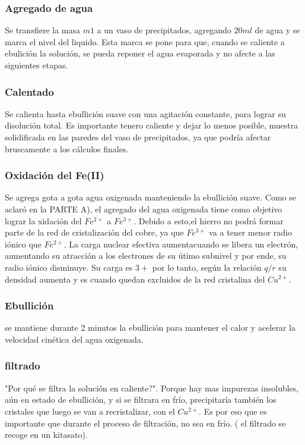 \documentclass[a4paper,12pt]{article}
\begin{document}
  \subsubsection{Agregado de agua} Se transfiere la masa  $m1$ a un vaso de precipitados, agregando $20ml$ de agua y se marca el nivel del liquido. Esta marca se pone para que, cuando se caliente a ebulición la solución, se pueda reponer el agua evaporada y no afecte a las siguientes etapas.
  
  \subsubsection{Calentado} Se calienta hasta ebullición suave con una agitación constante, para lograr su disolución total. Es importante tenero caliente y dejar lo menos posible, muestra solidificada en las paredes del vaso de precipitados, ya que podría afectar bruscamente a los cálculos finales.
  
  \subsubsection{Oxidación del Fe(II)}Se agrega gota a gota agua oxigenada manteniendo la ebullición suave. Como se aclaró en la PARTE A), el agregado del agua oxigenada tiene como objetivo lograr la xidación del $Fe^{2+}$ a $Fe^{3+}$. Debido a esto,el hierro no podrá formar parte de la red de cristalización del cobre, ya que $Fe^{3+}$ va a tener menor radio iónico que $Fe^{2+}$. La carga nuclear efectiva aumentacuando se libera un electrón, aumentando su atracción a los electrones de su útimo subnivel y por ende, su radio iónico disminuye. Su carga es $3+$ por lo tanto, según la relación $q/r$ su densidad aumenta y es cuando quedan excluidos de la red cristalina del $Cu^{2+}$.
  
  \subsubsection{Ebullición} se mantiene durante 2 minutos la ebullición para mantener el calor y acelerar la velocidad cinética del agua oxigenada. 
  
   \subsubsection{filtrado}"Por qué se filtra la solución en caliente?". Porque hay mas impurezas insolubles, aún en estado de ebullición, y si se filtrara en frío, precipitaría también los cristales que luego se van a recristalizar, con el $Cu^{2+}$. Es por eso que es importante que durante el proceso de filtración, no sea en frío. ( el filtrado se recoge en un kitasato).
   
\end{document}
